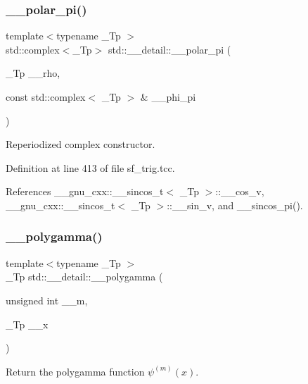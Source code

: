 \subsubsection{\texorpdfstring{\+\_\+\+\_\+polar\+\_\+pi()}{\_\_polar\_pi()}\hspace{0.1cm}{\footnotesize\ttfamily [2/2]}}
{\footnotesize\ttfamily template$<$typename \+\_\+\+Tp $>$ \\
std\+::complex$<$\+\_\+\+Tp$>$ std\+::\+\_\+\+\_\+detail\+::\+\_\+\+\_\+polar\+\_\+pi (\begin{DoxyParamCaption}\item[{\+\_\+\+Tp}]{\+\_\+\+\_\+rho,  }\item[{const std\+::complex$<$ \+\_\+\+Tp $>$ \&}]{\+\_\+\+\_\+phi\+\_\+pi }\end{DoxyParamCaption})\hspace{0.3cm}{\ttfamily [inline]}}

Reperiodized complex constructor. 

Definition at line 413 of file sf\+\_\+trig.\+tcc.



References \+\_\+\+\_\+gnu\+\_\+cxx\+::\+\_\+\+\_\+sincos\+\_\+t$<$ \+\_\+\+Tp $>$\+::\+\_\+\+\_\+cos\+\_\+v, \+\_\+\+\_\+gnu\+\_\+cxx\+::\+\_\+\+\_\+sincos\+\_\+t$<$ \+\_\+\+Tp $>$\+::\+\_\+\+\_\+sin\+\_\+v, and \+\_\+\+\_\+sincos\+\_\+pi().

\mbox{\label{namespacestd_1_1____detail_a25cc1b7c8adbc3b0fc8d4487ab23571c}} 
\subsubsection{\texorpdfstring{\+\_\+\+\_\+polygamma()}{\_\_polygamma()}}
{\footnotesize\ttfamily template$<$typename \+\_\+\+Tp $>$ \\
\+\_\+\+Tp std\+::\+\_\+\+\_\+detail\+::\+\_\+\+\_\+polygamma (\begin{DoxyParamCaption}\item[{unsigned int}]{\+\_\+\+\_\+m,  }\item[{\+\_\+\+Tp}]{\+\_\+\+\_\+x }\end{DoxyParamCaption})}



Return the polygamma function $ \psi^{(m)}(x) $. 

